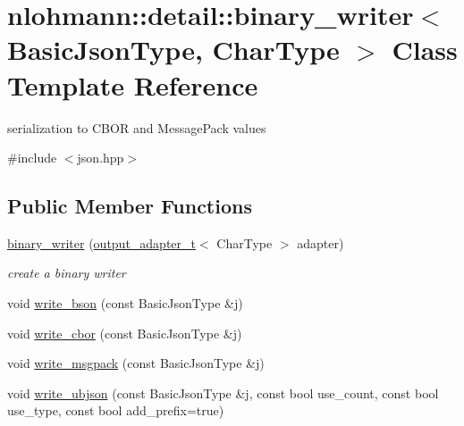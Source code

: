 \hypertarget{classnlohmann_1_1detail_1_1binary__writer}{}\section{nlohmann\+:\+:detail\+:\+:binary\+\_\+writer$<$ Basic\+Json\+Type, Char\+Type $>$ Class Template Reference}
\label{classnlohmann_1_1detail_1_1binary__writer}


serialization to C\+B\+OR and Message\+Pack values  




{\ttfamily \#include $<$json.\+hpp$>$}

\subsection*{Public Member Functions}
\begin{DoxyCompactItemize}
\item 
\mbox{\hyperlink{classnlohmann_1_1detail_1_1binary__writer_a373289af95a946c19bb4a58a5df71a78}{binary\+\_\+writer}} (\mbox{\hyperlink{namespacenlohmann_1_1detail_a9b680ddfb58f27eb53a67229447fc556}{output\+\_\+adapter\+\_\+t}}$<$ Char\+Type $>$ adapter)
\begin{DoxyCompactList}\small\item\em create a binary writer \end{DoxyCompactList}\item 
void \mbox{\hyperlink{classnlohmann_1_1detail_1_1binary__writer_a9ffc566db5219b473762462234b47db9}{write\+\_\+bson}} (const Basic\+Json\+Type \&j)
\item 
void \mbox{\hyperlink{classnlohmann_1_1detail_1_1binary__writer_aa0ab8d27fd88a33a2f801413ac4c7fbc}{write\+\_\+cbor}} (const Basic\+Json\+Type \&j)
\item 
void \mbox{\hyperlink{classnlohmann_1_1detail_1_1binary__writer_ae4e0852b64102ce4b07d99f08f828b7c}{write\+\_\+msgpack}} (const Basic\+Json\+Type \&j)
\item 
void \mbox{\hyperlink{classnlohmann_1_1detail_1_1binary__writer_a0f6c65053d859269f88eb4ebb0cd7060}{write\+\_\+ubjson}} (const Basic\+Json\+Type \&j, const bool use\+\_\+count, const bool use\+\_\+type, const bool add\+\_\+prefix=true)
\end{DoxyCompactItemize}
